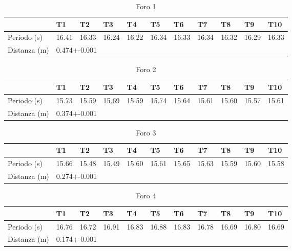 \documentclass[a4paper,10pt]{article}
\begin{document}
\begin{table}[!htb]
\centering
\caption{Foro 1}
\label{my-label}
\begin{tabular}{|l|l|l|l|l|l|l|l|l|l|l|}
\hline
             & T1    & T2    & T3    & T4    & T5    & T6    & T7    & T8    & T9    & T10   \\ \hline
Periodo (s)  & 16.41 & 16.33 & 16.24 & 16.22 & 16.34 & 16.33 & 16.34 & 16.32 & 16.29 & 16.33 \\ \hline
Distanza (m) & \multicolumn{10}{l|}{0.474+-0.001}                                             \\ \hline
\end{tabular}
\end{table}
\begin{table}[H]
\centering
\caption{Foro 2}
\label{my-label}
\begin{tabular}{|l|l|l|l|l|l|l|l|l|l|l|}
\hline
             & T1    & T2    & T3    & T4    & T5    & T6    & T7    & T8    & T9    & T10   \\ \hline
Periodo (s)  & 15.73 & 15.59 & 15.69 & 15.59 & 15.74 & 15.64 & 15.61 & 15.60 & 15.57 & 15.61 \\ \hline
Distanza (m) & \multicolumn{10}{l|}{0.374+-0.001}                                             \\ \hline
\end{tabular}
\end{table}
\begin{table}[H]
\centering
\caption{Foro 3}
\label{my-label}
\begin{tabular}{|l|l|l|l|l|l|l|l|l|l|l|}
\hline
             & T1    & T2    & T3    & T4    & T5    & T6    & T7    & T8    & T9    & T10   \\ \hline
Periodo (s)  & 15.66 & 15.48 & 15.49 & 15.60 & 15.61 & 15.65 & 15.63 & 15.59 & 15.60 & 15.58 \\ \hline
Distanza (m) & \multicolumn{10}{l|}{0.274+-0.001}                                             \\ \hline
\end{tabular}
\end{table}
\begin{table}[H]
\centering
\caption{Foro 4}
\label{my-label}
\begin{tabular}{|l|l|l|l|l|l|l|l|l|l|l|}
\hline
             & T1    & T2    & T3    & T4    & T5    & T6    & T7    & T8    & T9    & T10   \\ \hline
Periodo (s)  & 16.76 & 16.72 & 16.91 & 16.83 & 16.88 & 16.83 & 16.78 & 16.69 & 16.80 & 16.69 \\ \hline
Distanza (m) & \multicolumn{10}{l|}{0.174+-0.001}                                             \\ \hline
\end{tabular}
\end{table}
\end{document}
